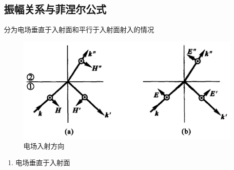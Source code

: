     \subsection{振幅关系与菲涅尔公式}
        分为电场垂直于入射面和平行于入射面射入的情况
        \begin{figure}[H]
            \centering  %
            \includegraphics[width=0.8\linewidth]{figs/电场入射情况.jpg}
            \caption{电场入射方向} %
            \end{figure}
        \begin{enumerate}[(1)]
            \item 电场垂直于入射面
                
        \end{enumerate}